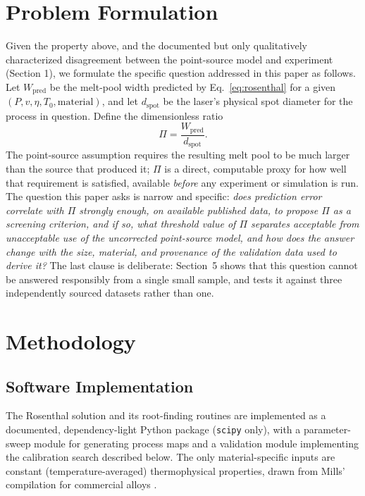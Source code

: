 \documentclass[12pt]{article}
\begin{document}
\section{Problem Formulation}

Given the property above, and the documented but only qualitatively characterized disagreement between the point-source model and experiment (Section 1), we formulate the specific question addressed in this paper as follows. Let $W_{\text{pred}}$ be the melt-pool width predicted by Eq.~\ref{eq:rosenthal} for a given $(P, v, \eta, T_0, \text{material})$, and let $d_{\text{spot}}$ be the laser's physical spot diameter for the process in question. Define the dimensionless ratio
\begin{equation}
\Pi = \frac{W_{\text{pred}}}{d_{\text{spot}}}.
\end{equation}
The point-source assumption requires the resulting melt pool to be much larger than the source that produced it; $\Pi$ is a direct, computable proxy for how well that requirement is satisfied, available \emph{before} any experiment or simulation is run. The question this paper asks is narrow and specific: \emph{does prediction error correlate with $\Pi$ strongly enough, on available published data, to propose $\Pi$ as a screening criterion, and if so, what threshold value of $\Pi$ separates acceptable from unacceptable use of the uncorrected point-source model, and how does the answer change with the size, material, and provenance of the validation data used to derive it?} The last clause is deliberate: Section~5 shows that this question cannot be answered responsibly from a single small sample, and tests it against three independently sourced datasets rather than one.

\section{Methodology}

\subsection{Software Implementation}
The Rosenthal solution and its root-finding routines are implemented as a documented, dependency-light Python package (\texttt{scipy} only), with a parameter-sweep module for generating process maps and a validation module implementing the calibration search described below. The only material-specific inputs are constant (temperature-averaged) thermophysical properties, drawn from Mills' compilation for commercial alloys \cite{mills2002}.
\end{document}

